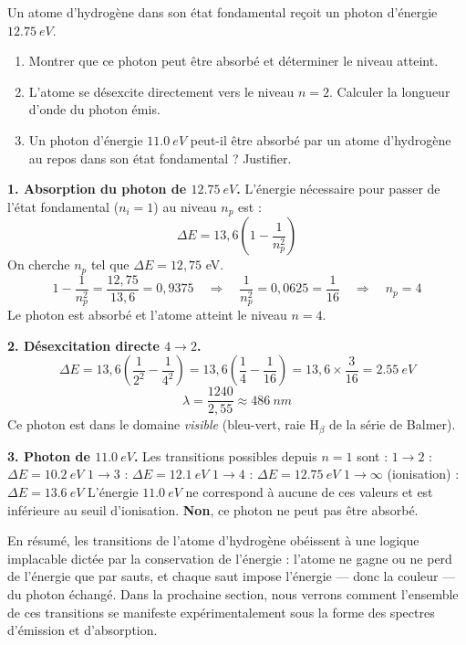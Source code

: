 \documentclass[11pt]{article}
\begin{document}
\begin{exercice}
Un atome d'hydrogène dans son état fondamental reçoit un photon d'énergie $\SI{12,75}{eV}$.
\begin{enumerate}
\item Montrer que ce photon peut être absorbé et déterminer le niveau atteint.
\item L'atome se désexcite directement vers le niveau $n = 2$. Calculer la longueur d'onde du photon émis.
\item Un photon d'énergie $\SI{11,0}{eV}$ peut-il être absorbé par un atome d'hydrogène au repos dans son état fondamental ? Justifier.
\end{enumerate}
\end{exercice}

\begin{corrige}
\textbf{1. Absorption du photon de $\SI{12,75}{eV}$.}
L'énergie nécessaire pour passer de l'état fondamental ($n_i=1$) au niveau $n_p$ est :
\[ \Delta E = 13{,}6 \left(1 - \frac{1}{n_p^2}\right) \]
On cherche $n_p$ tel que $\Delta E = 12{,}75$ eV.
\[ 1 - \frac{1}{n_p^2} = \frac{12{,}75}{13{,}6} = 0{,}9375 \quad \Rightarrow \quad \frac{1}{n_p^2} = 0{,}0625 = \frac{1}{16} \quad \Rightarrow \quad n_p = 4 \]
Le photon est absorbé et l'atome atteint le niveau $n=4$.

\textbf{2. Désexcitation directe $4 \rightarrow 2$.}
\[ \Delta E = 13{,}6 \left(\frac{1}{2^2} - \frac{1}{4^2}\right) = 13{,}6 \left(\frac{1}{4} - \frac{1}{16}\right) = 13{,}6 \times \frac{3}{16} = \SI{2,55}{eV} \]
\[ \lambda = \frac{1240}{2{,}55} \approx \SI{486}{nm} \]
Ce photon est dans le domaine \emph{visible} (bleu-vert, raie H$_\beta$ de la série de Balmer).

\textbf{3. Photon de $\SI{11,0}{eV}$.}
Les transitions possibles depuis $n=1$ sont :
$1 \rightarrow 2$ : $\Delta E = \SI{10,2}{eV}$
$1 \rightarrow 3$ : $\Delta E = \SI{12,1}{eV}$
$1 \rightarrow 4$ : $\Delta E = \SI{12,75}{eV}$
$1 \rightarrow \infty$ (ionisation) : $\Delta E = \SI{13,6}{eV}$
L'énergie $\SI{11,0}{eV}$ ne correspond à aucune de ces valeurs et est inférieure au seuil d'ionisation. \textbf{Non}, ce photon ne peut pas être absorbé.
\end{corrige}

En résumé, les transitions de l'atome d'hydrogène obéissent à une logique implacable dictée par la conservation de l'énergie : l'atome ne gagne ou ne perd de l'énergie que par sauts, et chaque saut impose l'énergie — donc la couleur — du photon échangé. Dans la prochaine section, nous verrons comment l'ensemble de ces transitions se manifeste expérimentalement sous la forme des spectres d'émission et d'absorption.
\end{document}
